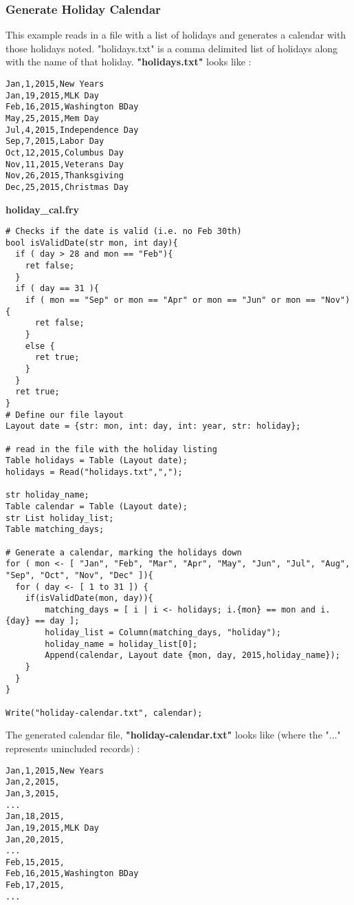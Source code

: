 \documentclass{article}
\begin{document}
\subsubsection{Generate Holiday Calendar}
\label{sec:cal_example}
This example reads in a file with a list of holidays and generates a calendar with those holidays noted. "holidays.txt" is a comma delimited list of holidays along with the name of that holiday. \textbf{"holidays.txt"} looks like :
\begin{lstlisting}
Jan,1,2015,New Years
Jan,19,2015,MLK Day
Feb,16,2015,Washington BDay
May,25,2015,Mem Day
Jul,4,2015,Independence Day
Sep,7,2015,Labor Day
Oct,12,2015,Columbus Day
Nov,11,2015,Veterans Day
Nov,26,2015,Thanksgiving
Dec,25,2015,Christmas Day
\end{lstlisting}
\textbf{holiday\_cal.fry}
\begin{lstlisting}
# Checks if the date is valid (i.e. no Feb 30th)
bool isValidDate(str mon, int day){
  if ( day > 28 and mon == "Feb"){
    ret false;
  }
  if ( day == 31 ){
    if ( mon == "Sep" or mon == "Apr" or mon == "Jun" or mon == "Nov"){
      ret false;
    }
    else {
      ret true;
    }
  }
  ret true;
}
# Define our file layout
Layout date = {str: mon, int: day, int: year, str: holiday};

# read in the file with the holiday listing
Table holidays = Table (Layout date);
holidays = Read("holidays.txt",",");

str holiday_name;
Table calendar = Table (Layout date);
str List holiday_list;
Table matching_days;

# Generate a calendar, marking the holidays down
for ( mon <- [ "Jan", "Feb", "Mar", "Apr", "May", "Jun", "Jul", "Aug", "Sep", "Oct", "Nov", "Dec" ]){
  for ( day <- [ 1 to 31 ]) {
    if(isValidDate(mon, day)){
        matching_days = [ i | i <- holidays; i.{mon} == mon and i.{day} == day ];
        holiday_list = Column(matching_days, "holiday");
        holiday_name = holiday_list[0];
        Append(calendar, Layout date {mon, day, 2015,holiday_name});
    }
  }
}

Write("holiday-calendar.txt", calendar);
\end{lstlisting}
The generated calendar file, \textbf{"holiday-calendar.txt"} looks like (where the "..." represents unincluded records) :
\begin{lstlisting}
Jan,1,2015,New Years
Jan,2,2015,
Jan,3,2015,
...
Jan,18,2015,
Jan,19,2015,MLK Day
Jan,20,2015,
...
Feb,15,2015,
Feb,16,2015,Washington BDay
Feb,17,2015,
...
\end{lstlisting}
\end{document}
